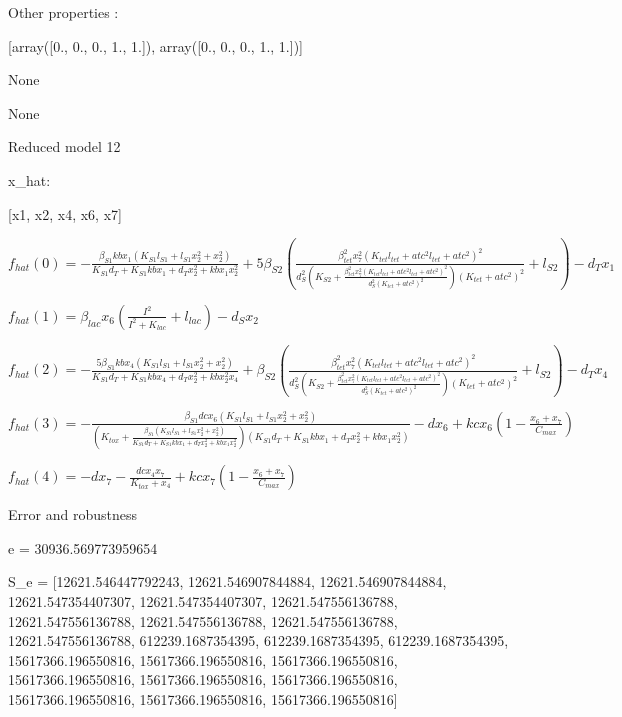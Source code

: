 Other properties :


[array([0., 0., 0., 1., 1.]), array([0., 0., 0., 1., 1.])]

None

None

Reduced model 12

x_{hat}: 

[x1, x2, x4, x6, x7]


$f_{hat}(0)=- \frac{\beta_{S1} kb x_{1} \left(K_{S1} l_{S1} + l_{S1} x_{2}^{2} + x_{2}^{2}\right)}{K_{S1} d_{T} + K_{S1} kb x_{1} + d_{T} x_{2}^{2} + kb x_{1} x_{2}^{2}} + 5 \beta_{S2} \left(\frac{\beta_{tet}^{2} x_{7}^{2} \left(K_{tet} l_{tet} + atc^{2} l_{tet} + atc^{2}\right)^{2}}{d_{S}^{2} \left(K_{S2} + \frac{\beta_{tet}^{2} x_{7}^{2} \left(K_{tet} l_{tet} + atc^{2} l_{tet} + atc^{2}\right)^{2}}{d_{S}^{2} \left(K_{tet} + atc^{2}\right)^{2}}\right) \left(K_{tet} + atc^{2}\right)^{2}} + l_{S2}\right) - d_{T} x_{1}$


$f_{hat}(1)=\beta_{lac} x_{6} \left(\frac{I^{2}}{I^{2} + K_{lac}} + l_{lac}\right) - d_{S} x_{2}$


$f_{hat}(2)=- \frac{5 \beta_{S1} kb x_{4} \left(K_{S1} l_{S1} + l_{S1} x_{2}^{2} + x_{2}^{2}\right)}{K_{S1} d_{T} + K_{S1} kb x_{4} + d_{T} x_{2}^{2} + kb x_{2}^{2} x_{4}} + \beta_{S2} \left(\frac{\beta_{tet}^{2} x_{7}^{2} \left(K_{tet} l_{tet} + atc^{2} l_{tet} + atc^{2}\right)^{2}}{d_{S}^{2} \left(K_{S2} + \frac{\beta_{tet}^{2} x_{7}^{2} \left(K_{tet} l_{tet} + atc^{2} l_{tet} + atc^{2}\right)^{2}}{d_{S}^{2} \left(K_{tet} + atc^{2}\right)^{2}}\right) \left(K_{tet} + atc^{2}\right)^{2}} + l_{S2}\right) - d_{T} x_{4}$


$f_{hat}(3)=- \frac{\beta_{S1} dc x_{6} \left(K_{S1} l_{S1} + l_{S1} x_{2}^{2} + x_{2}^{2}\right)}{\left(K_{tox} + \frac{\beta_{S1} \left(K_{S1} l_{S1} + l_{S1} x_{2}^{2} + x_{2}^{2}\right)}{K_{S1} d_{T} + K_{S1} kb x_{1} + d_{T} x_{2}^{2} + kb x_{1} x_{2}^{2}}\right) \left(K_{S1} d_{T} + K_{S1} kb x_{1} + d_{T} x_{2}^{2} + kb x_{1} x_{2}^{2}\right)} - d x_{6} + kc x_{6} \left(1 - \frac{x_{6} + x_{7}}{C_{max}}\right)$


$f_{hat}(4)=- d x_{7} - \frac{dc x_{4} x_{7}}{K_{tox} + x_{4}} + kc x_{7} \left(1 - \frac{x_{6} + x_{7}}{C_{max}}\right)$



Error and robustness 


e = 30936.569773959654

S_e = [12621.546447792243, 12621.546907844884, 12621.546907844884, 12621.547354407307, 12621.547354407307, 12621.547556136788, 12621.547556136788, 12621.547556136788, 12621.547556136788, 12621.547556136788, 612239.1687354395, 612239.1687354395, 612239.1687354395, 15617366.196550816, 15617366.196550816, 15617366.196550816, 15617366.196550816, 15617366.196550816, 15617366.196550816, 15617366.196550816, 15617366.196550816, 15617366.196550816]

